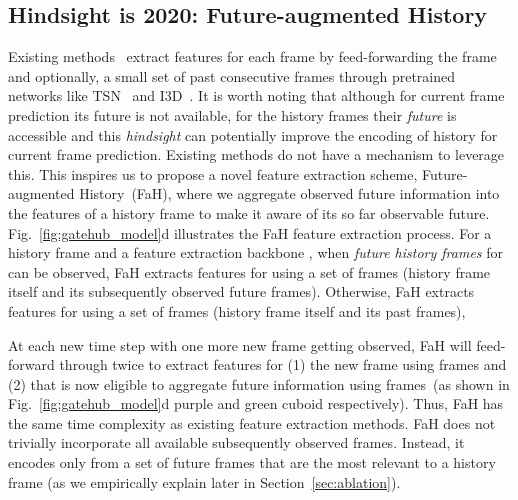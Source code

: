 \documentclass[10pt,twocolumn,letterpaper]{article}
\begin{document}
\subsection{Hindsight is 2020: Future-augmented History}
Existing methods~\cite{wang2021oadtr,xu2019temporal,xu2021long, gao2020woad, eun2020learning} extract features for each frame by feed-forwarding the frame and optionally, a small set of past consecutive frames through pretrained networks like TSN~\cite{wang2016temporal} and I3D~\cite{carreira2017quo}. It is worth noting that although for current frame prediction its future is not available, for the history frames their \textit{future} is accessible and this \textit{hindsight} can potentially improve the encoding of history for current frame prediction. Existing methods do not have a mechanism to leverage this.
This inspires us to propose a novel feature extraction scheme, Future-augmented History~(FaH), where we aggregate observed future information into the features of a history frame to make it aware of its so far observable future. 
Fig.~\ref{fig:gatehub_model}d illustrates the FaH feature extraction process. For a history frame  and a feature extraction backbone , when  \textit{future history frames} for  can be observed, FaH extracts features for  using a set of frames  (\ie history frame itself and its subsequently observed  future frames). Otherwise, FaH extracts features for  using a set of frames  (\ie history frame itself and its past  frames),

At each new time step with one more new frame getting observed, FaH will feed-forward through  twice to extract features for (1) the new frame using  frames and (2)  that is now eligible to aggregate future information using  frames~(as shown in Fig.~\ref{fig:gatehub_model}d purple and green cuboid respectively). Thus, FaH has the same time complexity as existing feature extraction methods. FaH does not trivially incorporate all available subsequently observed frames. Instead, it encodes only from a set of future frames that are the most relevant to a history frame (as we empirically explain later in Section~\ref{sec:ablation}).
\end{document}
